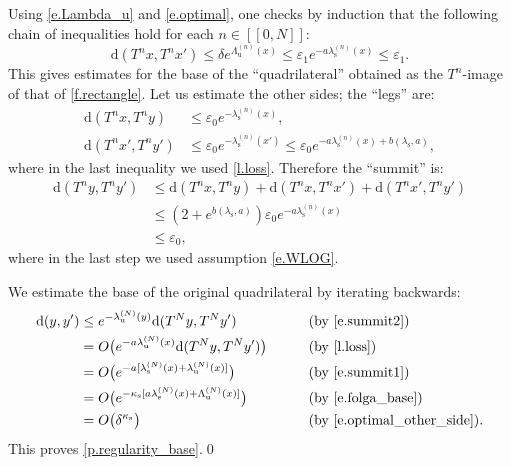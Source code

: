 \documentclass[10pt]{amsart}
\newcommand{\ldbrack}{[\![}
\newcommand{\rdbrack}{]\!]}
\theoremstyle{plain}
\theoremstyle{definition}
\newcommand{\dd}{\mathrm{d}}
\newcommand{\uu}{\mathrm{u}}
\renewcommand{\ss}{\mathrm{s}}
\let\epsilon\varepsilon
\begin{document}
Using \eqref{e.Lambda_u} and \eqref{e.optimal}, one checks by induction that
the following chain of inequa\-lities hold for each $n \in \ldbrack 0, N \rdbrack$:
\begin{equation}\label{e.base}
\dd(T^n x, T^n x')
\le \delta e^{\Lambda_\uu^{(n)}(x)}
\le \epsilon_1 e^{- a \lambda_\ss^{(n)}(x)}
\le \epsilon_1.
\end{equation}
This gives estimates for the base of the ``quadrilateral'' obtained as the $T^n$-image of that of \cref{f.rectangle}.
Let us estimate the other sides; the ``legs'' are:
\begin{align}
\dd(T^n x, T^n y) &\le \epsilon_0 e^{- \lambda_\ss^{(n)}(x)}, \label{e.leg1} \\
\dd(T^n x', T^n y') &\le \epsilon_0 e^{- \lambda_\ss^{(n)}(x')}
\le \epsilon_0 e^{- a\lambda_\ss^{(n)}(x) + b(\lambda_\ss,a)}, \label{e.leg2}
\end{align}
where in the last inequality we used \cref{l.loss}.
Therefore the ``summit'' is:
\begin{align}
\dd(T^n y, T^n y')
&\le \dd(T^n x, T^n y) + \dd(T^n x, T^n x') + \dd(T^n x', T^n y') \\
&\le (2 + e^{b(\lambda_\ss,a)}) \epsilon_0 e^{-a\lambda_\ss^{(n)}(x)} \label{e.summit1} \\
&\le \epsilon_0, \label{e.summit2}
\end{align}
where in the last step we used assumption \eqref{e.WLOG}.

We estimate the base of the original quadrilateral by iterating backwards:
\begin{alignat*}{2}
\dd(y,y')
&\le e^{-\lambda_\uu^{(N)}(y)} \dd(T^N y, T^N y')
&\qquad&\text{(by \eqref{e.summit2})} \\
&= O \big( e^{-a \lambda_\uu^{(N)}(x)} \dd(T^N y, T^N y') \big)
&\qquad&\text{(by \cref{l.loss})} \\
&= O \big( e^{-a [\lambda_\ss^{(N)}(x) + \lambda_\uu^{(N)}(x)]} \big)
&\qquad&\text{(by \eqref{e.summit1})} \\
&= O \big( e^{- \kappa_\ss [a \lambda_\ss^{(N)}(x) + \Lambda_\uu^{(N)}(x)]} \big)
&\qquad&\text{(by \eqref{e.folga_base})} \\
&= O \big( \delta^{\kappa_\ss} \big)
&\quad&\text{(by \eqref{e.optimal_other_side})}.
\end{alignat*}
This proves \cref{p.regularity_base}.\qed
\end{document}
